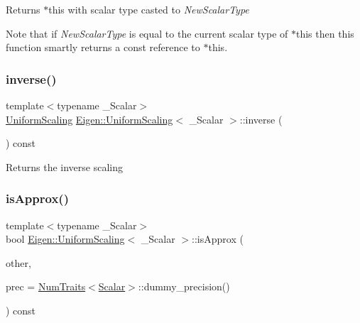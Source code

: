 \begin{DoxyReturn}{Returns}
{\ttfamily $\ast$this} with scalar type casted to {\itshape New\+Scalar\+Type} 
\end{DoxyReturn}
Note that if {\itshape New\+Scalar\+Type} is equal to the current scalar type of {\ttfamily $\ast$this} then this function smartly returns a const reference to {\ttfamily $\ast$this}. \mbox{\label{class_eigen_1_1_uniform_scaling_a60dba22bebe9e2c97cfbc76f85eb1b78}} 
\subsubsection{\texorpdfstring{inverse()}{inverse()}}
{\footnotesize\ttfamily template$<$typename \+\_\+\+Scalar$>$ \\
\mbox{\hyperlink{class_eigen_1_1_uniform_scaling}{Uniform\+Scaling}} \mbox{\hyperlink{class_eigen_1_1_uniform_scaling}{Eigen\+::\+Uniform\+Scaling}}$<$ \+\_\+\+Scalar $>$\+::inverse (\begin{DoxyParamCaption}{ }\end{DoxyParamCaption}) const\hspace{0.3cm}{\ttfamily [inline]}}

\begin{DoxyReturn}{Returns}
the inverse scaling 
\end{DoxyReturn}
\mbox{\label{class_eigen_1_1_uniform_scaling_a7f736fdbe43f7bce3d277312efdc315e}} 
\subsubsection{\texorpdfstring{isApprox()}{isApprox()}}
{\footnotesize\ttfamily template$<$typename \+\_\+\+Scalar$>$ \\
bool \mbox{\hyperlink{class_eigen_1_1_uniform_scaling}{Eigen\+::\+Uniform\+Scaling}}$<$ \+\_\+\+Scalar $>$\+::is\+Approx (\begin{DoxyParamCaption}\item[{const \mbox{\hyperlink{class_eigen_1_1_uniform_scaling}{Uniform\+Scaling}}$<$ \+\_\+\+Scalar $>$ \&}]{other,  }\item[{const typename \mbox{\hyperlink{struct_eigen_1_1_num_traits}{Num\+Traits}}$<$ \mbox{\hyperlink{class_eigen_1_1_uniform_scaling_a04c4339f58f1210c5d4d34b1bd7ae283}{Scalar}} $>$\+::Real \&}]{prec = {\ttfamily \mbox{\hyperlink{struct_eigen_1_1_num_traits}{Num\+Traits}}$<$\mbox{\hyperlink{class_eigen_1_1_uniform_scaling_a04c4339f58f1210c5d4d34b1bd7ae283}{Scalar}}$>$\+:\+:dummy\+\_\+precision()} }\end{DoxyParamCaption}) const\hspace{0.3cm}{\ttfamily [inline]}}

